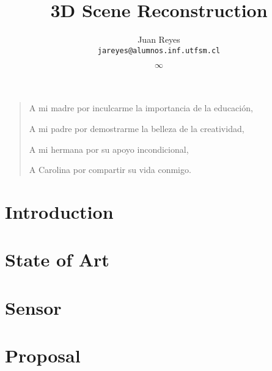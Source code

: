 \documentclass[spanish,english,12pt,letterpaper,oneside]{book}
\title{3D Scene Reconstruction}
\author{
  Juan Reyes \\ \texttt{jareyes@alumnos.inf.utfsm.cl}
}
\date{$\infty$}
\begin{document}
    \newenvironment{dedication}
        {\vspace{6ex}\begin{quotation}\begin{center}\begin{em}}
        {\par\end{em}\end{center}\end{quotation}}

\frontmatter



\begin{dedication}
A mi madre por inculcarme la importancia de la educaci\'on,

A mi padre por demostrarme la belleza de la creatividad,

A mi hermana por su apoyo incondicional,

A Carolina por compartir su vida conmigo.
\end{dedication}






\tableofcontents

{}
\listoffigures
{}
\listoftables

\mainmatter

\chapter{Introduction}
\label{introduccion}



\chapter{State of Art}


\chapter{Sensor}


\chapter{Proposal}








\end{document}
